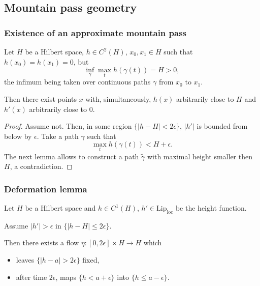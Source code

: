 \documentclass[9pt, english]{beamer}
\theoremstyle{definition}
\begin{document}
\subsection{Mountain pass geometry}

\begin{frame}
\frametitle{Existence of an approximate mountain pass}
\begin{theorem}
Let $H$ be a Hilbert space, $h \in C^2(H)$, $x_0,x_1 \in H$ such
that $h(x_0) = h(x_1) = 0$, but
\begin{equation}
\inf_\gamma \max_t h(\gamma(t)) = H > 0,
\end{equation}
the infimum being taken over continuous paths $\gamma$ from $x_0$ to
$x_1$.

Then there exist points $x$ with, simultaneously, $h(x)$ arbitrarily
close to $H$ and $h'(x)$ arbitrarily close to $0$.
\end{theorem}
\pause
\begin{proof}
Assume not. Then, in some region $\{ |h-H| < 2 \epsilon \}$, $|h'|$
is bounded from below by $\epsilon$. Take a path $\gamma$ such that
\[
\max_t h(\gamma(t)) < H + \epsilon.
\]
The next lemma allows to construct a path $\tilde\gamma$ with
maximal height smaller then $H$, a contradiction.
\end{proof}
\end{frame}

\begin{frame}
\frametitle{Deformation lemma}
\begin{lemma}
Let $H$ be a Hilbert space and $h \in C^1 (H)$, $h' \in
\text{Lip}_\text{loc}$ be the height function.

Assume $|h'|>\epsilon$ in $\{ |h - H| \leq 2 \epsilon \}$.

Then there exists a flow $\eta : [0,2 \epsilon] \times H \to H$
which
\begin{itemize}
\item leaves $\{ |h - a| > 2 \epsilon \}$ fixed,
\item after time $2\epsilon$, maps $\{ h < a + \epsilon\}$ into $\{ h \leq a - \epsilon \}$.
\end{itemize}
\end{lemma}
\end{frame}
\end{document}
